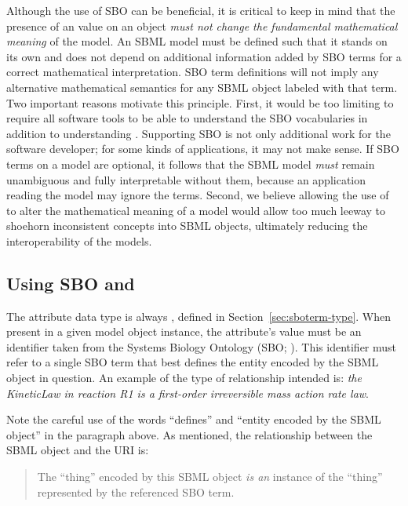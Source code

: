 Although the use of SBO can be beneficial, it is critical to keep
in mind that the presence of an  value on an object
\emph{must not change the fundamental mathematical meaning} of the
model.  An SBML model must be defined such that it stands on its
own and does not depend on additional information added by SBO
terms for a correct mathematical interpretation.  SBO term
definitions will not imply any alternative mathematical semantics
for any SBML object labeled with that term.  Two important
reasons motivate this principle.  First, it would be too limiting
to require all software tools to be able to understand the SBO
vocabularies in addition to understanding .
Supporting SBO is not only additional work for the software
developer; for some kinds of applications, it may not make sense.
If SBO terms on a model are optional, it follows that the SBML
model \emph{must} remain unambiguous and fully interpretable
without them, because an application reading the model may ignore
the terms.  Second, we believe allowing the use of 
to alter the mathematical meaning of a model would allow
  too much leeway to shoehorn inconsistent concepts into SBML
objects, ultimately reducing the interoperability of the
models.

\subsection{Using SBO and }

The  attribute data type is always
, defined in Section~\ref{sec:sboterm-type}.
When present in a given model object instance, the
attribute's value must be an identifier taken from the
Systems Biology Ontology (SBO; \sboref).  This identifier must
refer to a single SBO term that best defines the entity encoded by
the SBML object in question.  An example of the type of
relationship intended is: \emph{the KineticLaw in reaction R1 is a
  first-order irreversible mass action rate law}.

Note the careful use of the words ``defines'' and ``entity encoded
by the SBML object'' in the paragraph above.  As mentioned, the
relationship between the SBML object and the URI is:

\begin{quote}
  The ``thing'' encoded by this SBML object \emph{is an} instance
  of the ``thing'' represented by the referenced SBO term.
\end{quote}


